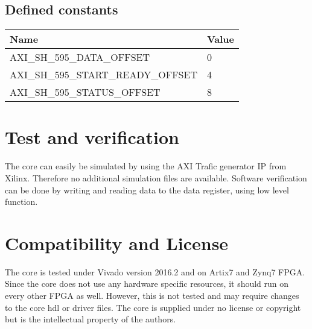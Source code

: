 \subsection{Defined constants}

\begin{table}[h]
	\centering
	\label{tbl::software_defines}
	\begin{tabular}{l|l}
		Name & Value \\
		\hline 
		AXI\_SH\_595\_DATA\_OFFSET & 0 \\
		\hline 
		AXI\_SH\_595\_START\_READY\_OFFSET & 4 \\
		\hline 
		AXI\_SH\_595\_STATUS\_OFFSET & 8 \\
	\end{tabular} 
	
\end{table}


\section{Test and verification}
\label{sec::test}

The core can easily be simulated by using the AXI Trafic generator IP from Xilinx.
Therefore no additional simulation files are available.
Software verification can be done by writing and reading data to the data register, using low level function.

\section{Compatibility and License}
The core is tested under Vivado version 2016.2 and on Artix7 and Zynq7 FPGA.
Since the core does not use any hardware specific resources, it should run on every other FPGA as well.
However, this is not tested and may require changes to the core hdl or driver files.
The core is supplied under no license or copyright but is the intellectual property of the authors.

